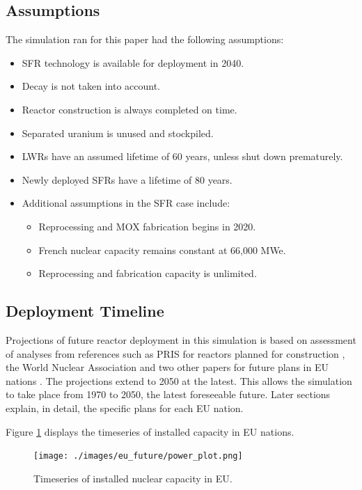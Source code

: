 \subsection{Assumptions}
The simulation ran for this paper had the following assumptions:
\begin{itemize}
        \item \gls{SFR} technology is available for deployment in 2040.
        \item Decay is not taken into account.
        \item Reactor construction is always completed on time.
        \item Separated uranium is unused and stockpiled.
        \item \glspl{LWR} have an assumed lifetime of 60 years, unless shut down prematurely.
        \item Newly deployed \glspl{SFR} have a lifetime of 80 years.
        \item Additional assumptions in the \gls{SFR} case include:
        \begin{itemize}
        	\item Reprocessing and \gls{MOX} fabrication begins in 2020.
        	\item French nuclear capacity remains constant at 66,000 MWe.
        	\item Reprocessing and fabrication capacity is unlimited.
        \end{itemize}
\end{itemize}


\subsection{Deployment Timeline}
Projections of future reactor deployment in this simulation is based on assessment of analyses
from references such as \gls{PRIS} for reactors planned for construction \cite{iaea_pris_nodate},
the World Nuclear Association and two other papers for future plans in EU nations
\cite{world_nuclear_association_nuclear_2017, joskow_future_2012, hatch_politics_2015}.
The projections extend to 2050 at the latest. This allows the simulation to take place from
1970 to 2050, the latest foreseeable future. Later sections explain, in detail, the specific plans for each \gls{EU} nation.

Figure \ref{fig:eu_pow} displays the
timeseries of installed capacity in \gls{EU} nations.

\begin{figure}[htbp!]
	\begin{center}
		\texttt{[image: ./images/eu\_future/power\_plot.png]}
	\end{center}
	\caption{Timeseries of installed nuclear capacity in \gls{EU}.}
	\label{fig:eu_pow}
\end{figure}
\FloatBarrier

